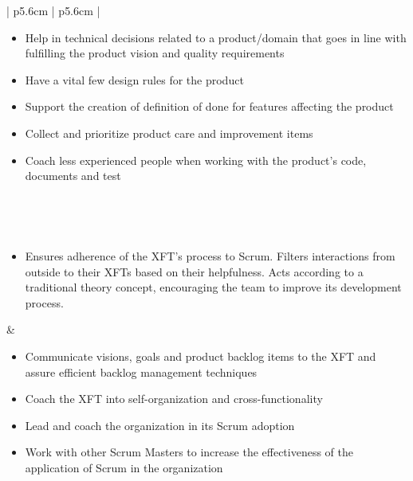 \begin{table}
\begin{tabularx}{\textwidth}{ | p{5.6cm} | p{5.6cm} | }
   \begin{itemize}[label={}, leftmargin=*, topsep=0pt, itemsep=0pt, partopsep=0pt]
     \item Help in technical decisions related to a product/domain that goes in line with fulfilling the product vision and quality requirements
     \item Have a vital few design rules for the product
     \item Support the creation of definition of done for features affecting the product
     \item Collect and prioritize product care and improvement items
     \item Coach less experienced people when working with the product's code, documents and test 
   \end{itemize} 
   
   \\ \hline

   
   \\ \hline 
   
   \begin{itemize}[label={}, leftmargin=*, topsep=0pt, itemsep=0pt, partopsep=0pt]
     \item Ensures adherence of the XFT's process to Scrum. Filters interactions from outside to their XFTs based on their helpfulness. Acts according to a traditional theory concept, encouraging the team to improve its development process.
   \end{itemize} & 
   
   \begin{itemize}[label={}, leftmargin=*, topsep=0pt, itemsep=0pt, partopsep=0pt]
     \item Communicate visions, goals and product backlog items to the XFT and assure efficient backlog management techniques
     \item Coach the XFT into self-organization and cross-functionality
     \item Lead and coach the organization in its Scrum adoption
     \item Work with other Scrum Masters to increase the effectiveness of the application of Scrum in the organization 
   \end{itemize} 
   
   \\ \hline

   

\end{tabularx}
\end{table}
